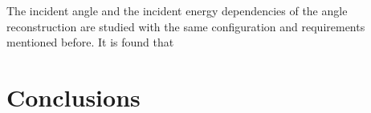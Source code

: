 \documentclass[jkps,preprint,fleqn,showpacs,showkeys]{revtex4}
\begin{document}
The incident angle and the incident energy dependencies of the angle reconstruction are studied with the same configuration and requirements mentioned before. It is found that 




\section{Conclusions}

\label{sec:con}



\begin{acknowledgments}
\end{acknowledgments}


\end{document}
